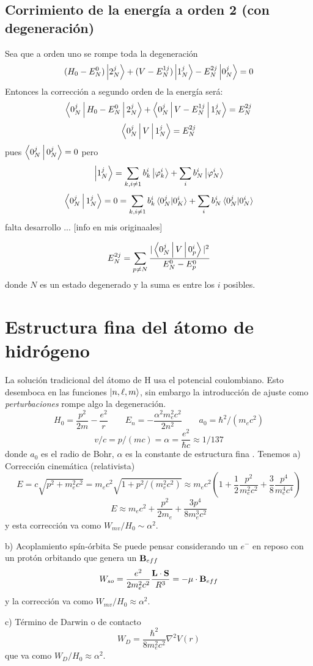 \documentclass[10pt,oneside]{CBFT_book}
\begin{document}
\subsection{Corrimiento de la energía a orden 2 (con degeneración)}

Sea que a orden uno se rompe toda la degeneración 
\[
	(H_0 - E_N^0) \Ket{2_N^j} + (V - E_N^{1 j}) \Ket{1_N^j} - E_N^{2 j} \Ket{0_N^j} = 0
\]
Entonces la corrección a segundo orden de la energía será:
\[
	\Braket{0_N^j | H_0 - E_N^0 | 2_N^j} + \Braket{ 0_N^j | V - E_N^{1 j} | 1_N^j} = E_N^{2 j}
\]
\[
	\Braket{ 0_N^j | V | 1_N^j} = E_N^{2 j}
\]
pues $\Braket{0_N^j|0_N^j}= 0$ pero 
\[
	\Ket{1_N^j} = \sum_{k,i\neq 1} b_k^i \Ket{\varphi_k^i} + \sum_i b_N^i \Ket{\varphi_N^i}
\]
\[
	\Braket{0_N^j|1_N^j} = 0 = \sum_{k,i\neq 1} b_k^i \braket{0_N^j|0_K^i} + 
		\sum_i b_N^i \braket{0_N^j|0_N^i}
\]
falta desarrollo ... [info en mis originaales]

\[
	E_N^{2j} = \sum_{p\neq N} \frac{|\Braket{0_N^j|V|0_p^i}|^2}{E_N^0 - E_p^0}
\]
donde $N$ es un estado degenerado y la suma es entre los $i$ posibles.

\section{Estructura fina del átomo de hidrógeno}

La solución tradicional del átomo de H usa el potencial coulombiano. Esto desemboca en las funciones 
$\Ket{n,\ell,m}$, sin embargo la introducción de ajuste como {\it perturbaciones} rompe algo la degeneración.
\[
	H_0=\frac{p^2}{2m} - \frac{e^2}{r} \qquad E_n = -\frac{\alpha^2m_e^2c^2}{2n^2} \qquad 
	a_0 = \hbar^2/(m_ec^2)
\]
\[
	v/c = p/(mc) = \alpha = \frac{e^2}{\hbar c} \approx 1/137
\]
donde $a_0$ es el radio de Bohr, $\alpha$ es la constante de estructura fina .
Tenemos 
a) Corrección cinemática (relativista)
\[	
	E = c \sqrt{p^2 + m_e^2c^2} = m_ec^2\sqrt{1 + p^2/(m_e^2c^2)} \approx 
	m_ec^2 \left( 1 + \frac{1}{2}\frac{p^2}{m_e^2c^2} + \frac{3}{8}\frac{p^4}{m_e^4c^4} \right)
\]
\[
	E \approx m_ec^2 + \frac{p^2}{2m_e} + \frac{3p^4}{8m_e^3c^2}
\]
y esta corrección va como $W_{mv}/H_0 \sim \alpha^2$.

b) Acoplamiento spín-órbita
Se puede pensar considerando un $e^-$ en reposo con un protón orbitando que genera un $\vb{B}_{eff}$
\[
	W_{so} = \frac{e^2}{2m_e^2c^2} \frac{\vb{L}\cdot\vb{S}}{R^3} = -\vb{\mu}\cdot\vb{B}_{eff}
\]
y la corrección va como $W_{mv}/H_0 \approx \alpha^2$.

c) Término de Darwin o de contacto
\[
	W_D = \frac{\hbar^2}{8m_e^2c^2} \nabla^2 V(r)
\]
que va como  $W_{D}/H_0 \approx \alpha^2$.
\end{document}
